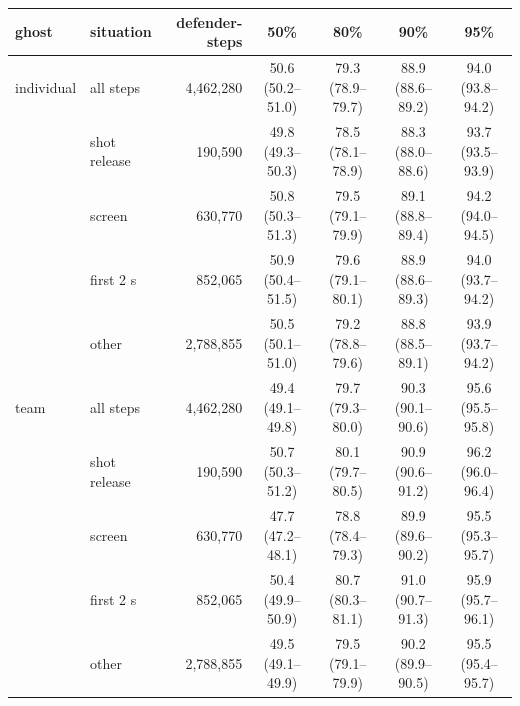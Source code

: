 \begin{tabular}{llrcccc}
\hline
ghost & situation & defender-steps & 50\% & 80\% & 90\% & 95\% \\
\hline
individual & all steps & 4,462,280 & 50.6 (50.2--51.0) & 79.3 (78.9--79.7) & 88.9 (88.6--89.2) & 94.0 (93.8--94.2) \\
 & shot release & 190,590 & 49.8 (49.3--50.3) & 78.5 (78.1--78.9) & 88.3 (88.0--88.6) & 93.7 (93.5--93.9) \\
 & screen & 630,770 & 50.8 (50.3--51.3) & 79.5 (79.1--79.9) & 89.1 (88.8--89.4) & 94.2 (94.0--94.5) \\
 & first 2 s & 852,065 & 50.9 (50.4--51.5) & 79.6 (79.1--80.1) & 88.9 (88.6--89.3) & 94.0 (93.7--94.2) \\
 & other & 2,788,855 & 50.5 (50.1--51.0) & 79.2 (78.8--79.6) & 88.8 (88.5--89.1) & 93.9 (93.7--94.2) \\
team & all steps & 4,462,280 & 49.4 (49.1--49.8) & 79.7 (79.3--80.0) & 90.3 (90.1--90.6) & 95.6 (95.5--95.8) \\
 & shot release & 190,590 & 50.7 (50.3--51.2) & 80.1 (79.7--80.5) & 90.9 (90.6--91.2) & 96.2 (96.0--96.4) \\
 & screen & 630,770 & 47.7 (47.2--48.1) & 78.8 (78.4--79.3) & 89.9 (89.6--90.2) & 95.5 (95.3--95.7) \\
 & first 2 s & 852,065 & 50.4 (49.9--50.9) & 80.7 (80.3--81.1) & 91.0 (90.7--91.3) & 95.9 (95.7--96.1) \\
 & other & 2,788,855 & 49.5 (49.1--49.9) & 79.5 (79.1--79.9) & 90.2 (89.9--90.5) & 95.5 (95.4--95.7) \\
\hline
\end{tabular}
\par{}
